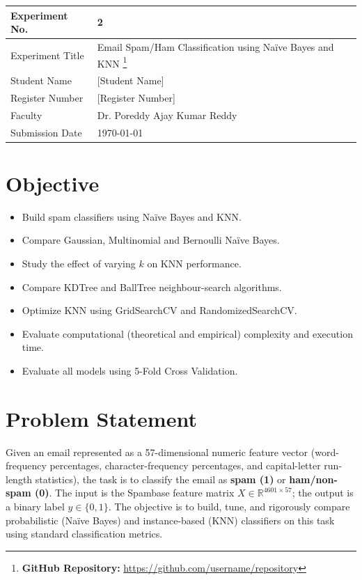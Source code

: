 \documentclass[12pt,a4paper]{article}
\begin{document}
\begin{tabular}{|p{4cm}|p{11cm}|}
\hline
Experiment No. & 2 \\ \hline
Experiment Title & Email Spam/Ham Classification using Na\"ive Bayes and KNN
\footnote{\textbf{GitHub Repository: }\url{https://github.com/username/repository}}\\ \hline
Student Name & [Student Name] \\ \hline
Register Number & [Register Number] \\ \hline
Faculty & Dr. Poreddy Ajay Kumar Reddy \\ \hline
Submission Date & \today \\ \hline
\end{tabular}

\section{Objective}
\begin{itemize}
\item Build spam classifiers using Na\"ive Bayes and KNN.
\item Compare Gaussian, Multinomial and Bernoulli Na\"ive Bayes.
\item Study the effect of varying $k$ on KNN performance.
\item Compare KDTree and BallTree neighbour-search algorithms.
\item Optimize KNN using GridSearchCV and RandomizedSearchCV.
\item Evaluate computational (theoretical and empirical) complexity and execution time.
\item Evaluate all models using 5-Fold Cross Validation.
\end{itemize}

\section{Problem Statement}
Given an email represented as a 57-dimensional numeric feature vector (word-frequency percentages, character-frequency percentages, and capital-letter run-length statistics), the task is to classify the email as \textbf{spam (1)} or \textbf{ham/non-spam (0)}. The input is the Spambase feature matrix $X \in \mathbb{R}^{4601 \times 57}$; the output is a binary label $y \in \{0,1\}$. The objective is to build, tune, and rigorously compare probabilistic (Na\"ive Bayes) and instance-based (KNN) classifiers on this task using standard classification metrics.
\end{document}
